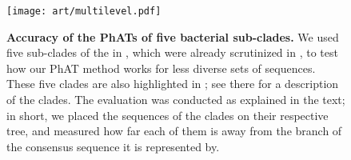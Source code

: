 \begin{figure}[hpbt]
    \centering
    \texttt{[image: art/multilevel.pdf]}
    \begin{subfigure}{0pt}
        \label{fig:multilevel:sub:edge_unconstr}
    \end{subfigure}
    \begin{subfigure}{0pt}
        \label{fig:multilevel:sub:edge_constr}
    \end{subfigure}
    \begin{subfigure}{0pt}
        \label{fig:multilevel:sub:branch_unconstr}
    \end{subfigure}
    \begin{subfigure}{0pt}
        \label{fig:multilevel:sub:branch_constr}
    \end{subfigure}
    \caption[Accuracy of the \acsp{PhAT} of five bacterial sub-clades]{
        \textbf{Accuracy of the \acsp{PhAT} of five bacterial sub-clades.}
        We used five sub-clades of the  in ,
        which were already scrutinized in \citep{Kozlov2016},
        to test how our \ac{PhAT} method works for less diverse sets of sequences.
        These five clades are also highlighted in ;
        see there for a description of the clades.
        The evaluation was conducted as explained in the text;
        in short, we placed the  sequences of the clades on their respective tree,
        and measured how far each of them is away from the branch of the consensus sequence it is represented by.
    }
    \label{fig:multilevel}
\end{figure}



